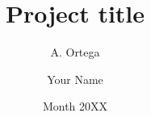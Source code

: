 \documentclass[thesis]{mas_report}
\author{A. Ortega}
\author{Your Name}
\title{Project title}
\date{Month 20XX}
\begin{document}
\begin{titlepage}
    \maketitle
\end{titlepage}




% 



%


\tableofcontents
\listoffigures
\listoftables




\mainmatter %











\appendix
% 

\backmatter


%

\end{document}
